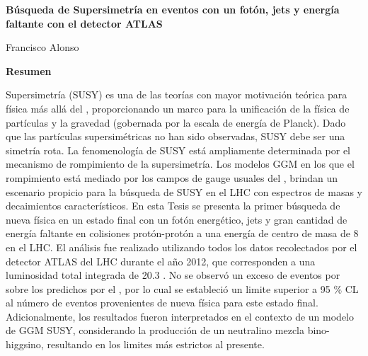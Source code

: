 \thispagestyle{plain}
\begin{center}
  \Large
  \textbf{Búsqueda de Supersimetría en eventos con un fotón,
      jets y energía faltante con el detector ATLAS}

  \vspace{0.4cm}
  \large

  \vspace{0.4cm}
  Francisco Alonso

  \vspace{2cm}
  \textbf{Resumen}
\end{center}

Supersimetría (SUSY) es una de las teorías con mayor motivación teórica para
física más allá del {\SM}, proporcionando un marco para la unificación de la
física de partículas y la gravedad (gobernada por la escala de
energía de Planck). Dado que las partículas supersimétricas no han sido
observadas, SUSY debe ser una simetría rota. La fenomenología de SUSY está
ampliamente determinada por el mecanismo de rompimiento de la supersimetría. Los
modelos GGM en los que el rompimiento está mediado por los campos de gauge usuales
del {\SM}, brindan un escenario propicio para la búsqueda de SUSY en el
LHC con espectros de masas y decaimientos característicos. En esta Tesis se
presenta la primer búsqueda de nueva física en un estado final con un fotón energético, jets y
gran cantidad de energía faltante en colisiones protón-protón a una energía de
centro de masa de 8 \tev en el LHC. El análisis fue realizado utilizando todos
los datos recolectados por el detector ATLAS del LHC durante el a\~no 2012, que
corresponden a una luminosidad total integrada de 20.3 \ifb. No se observó un
exceso de eventos por sobre los predichos por el {\SM}, por lo cual se
estableció un limite superior a 95 \% CL al número de eventos provenientes de
nueva física para este estado final. Adicionalmente, los resultados fueron
interpretados en el contexto de un modelo de GGM SUSY, considerando la
producción de un neutralino mezcla bino-higgsino, resultando en los limites más
estrictos al presente.
